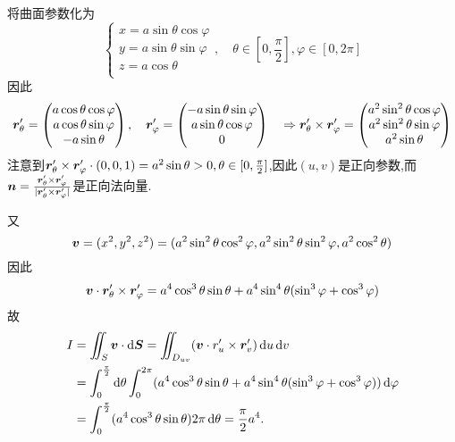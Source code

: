 \begin{solution}
    将曲面参数化为
    $$\begin{cases}
        x = a \sin \theta \cos \varphi\\
        y = a \sin \theta \sin \varphi\\
        z = a \cos \theta\\
    \end{cases}, \quad \theta \in \left[0,\frac{\pi}{2}\right], \varphi \in [0,2\pi]$$
    因此$$\bm{r}_\theta' = \begin{pmatrix}
        a \cos \theta \cos \varphi\\
        a \cos \theta \sin \varphi\\
        -a \sin \theta\\
    \end{pmatrix}, \quad \bm{r}_\varphi' = \begin{pmatrix}
        -a \sin \theta \sin \varphi\\
        a \sin \theta \cos \varphi\\
        0\\
    \end{pmatrix} \quad \Rightarrow \bm{r}_\theta' \times \bm{r}_\varphi' = \begin{pmatrix}
        a^2 \sin^2 \theta \cos \varphi\\
        a^2 \sin^2 \theta \sin \varphi\\
        a^2 \sin \theta\\
    \end{pmatrix}$$
    注意到$\bm{r}_\theta' \times \bm{r}_\varphi' \cdot (0,0,1) = a^2 \sin \theta >0,\theta \in [0,\frac{\pi}{2}]$,因此$(u,v)$是正向参数,而$\bm{n} = \frac{\bm{r}_\theta' \times \bm{r}_\varphi'}{|\bm{r}_\theta' \times \bm{r}_\varphi'|}$是正向法向量.
    
    又$$\bm{v} = (x^2,y^2,z^2) = (a^2 \sin^2 \theta \cos^2 \varphi, a^2 \sin^2 \theta \sin^2 \varphi, a^2 \cos^2 \theta)$$
    因此$$\bm{v} \cdot \bm{r}_\theta' \times \bm{r}_\varphi' = a^4 \cos^3 \theta \sin \theta + a^4 \sin^4 \theta (\sin^3 \varphi + \cos^3 \varphi)$$
    故
    \begin{align*}
        I &= \iint_S \bm{v} \cdot \operatorname{d\!} \bm{S} = \iint_{D_{uv}} ( \bm{v} \cdot r_u' \times \bm{r}_v') \operatorname{d\!} u \operatorname{d\!} v\\
        &= \int_0^{\frac{\pi}{2}} \operatorname{d\!} \theta \int_0^{2\pi} (a^4 \cos^3 \theta \sin \theta + a^4 \sin^4 \theta (\sin^3 \varphi + \cos^3 \varphi)) \operatorname{d\!} \varphi\\
        &=\int_0^{\frac{\pi}{2}} (a^4 \cos^3 \theta \sin \theta)2 \pi \operatorname{d\!} \theta = \frac{\pi}{2} a^4.
    \end{align*}
\end{solution}

